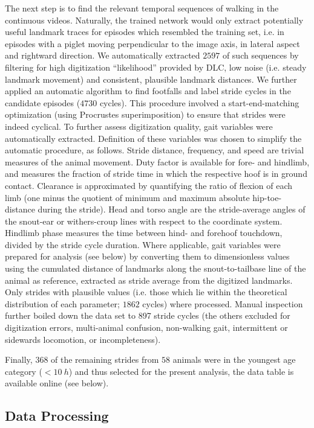 The next step is to find the relevant temporal sequences of walking in the continuous videos.
Naturally, the trained network would only extract potentially useful landmark traces for episodes which resembled the training set, i.e. in episodes with a piglet moving perpendicular to the image axis, in lateral aspect and rightward direction.
We automatically extracted \(2597\) of such sequences by filtering for high digitization ``likelihood'' provided by DLC, low noise (i.e. steady landmark movement) and consistent, plausible landmark distances.
We further applied an automatic algorithm to find footfalls and label stride cycles in the candidate episodes (\(4730\) cycles).
This procedure involved a start-end-matching optimization (using Procrustes superimposition) to ensure that strides were indeed cyclical.
To further assess digitization quality, gait variables were automatically extracted.
Definition of these variables was chosen to simplify the automatic procedure, as follows.
Stride distance, frequency, and speed are trivial measures of the animal movement.
Duty factor is available for fore- and hindlimb, and measures the fraction of stride time in which the respective hoof is in ground contact.
Clearance is approximated by quantifying the ratio of flexion of each limb (one minus the quotient of minimum and maximum absolute hip-toe-distance during the stride).
Head and torso angle are the stride-average angles of the snout-ear or withers-croup lines with respect to the coordinate system.
Hindlimb phase measures the time between hind- and forehoof touchdown, divided by the stride cycle duration.
Where applicable, gait variables were prepared for analysis (see below) by converting them to dimensionless values \citep{Hof1996,Alexander1983} using the cumulated distance of landmarks along the snout-to-tailbase line of the animal as reference, extracted as stride average from the digitized landmarks.
Only strides with plausible values (i.e. those which lie within the theoretical distribution of each parameter; \(1862\) cycles) where processed.
Manual inspection further boiled down the data set to 897 stride cycles (the others excluded for digitization errors, multi-animal confusion, non-walking gait, intermittent or sidewards locomotion, or incompleteness).

Finally, \(368\) of the remaining strides from \(58\) animals were in the youngest age category (\(<10\ h\)) and thus selected for the present analysis, the data table is available online (see below).


\subsection{Data Processing}
\label{sec:orgcb0a26c}

